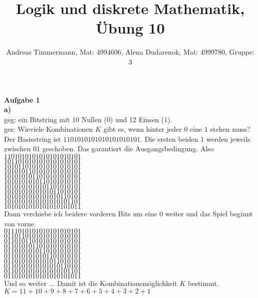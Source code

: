 \documentclass[a4paper]{scrartcl}
\title{Logik und diskrete Mathematik, Übung 10}
\author{Andreas Timmermann, Mat: 4994606, Alena Dudarenok, Mat: 4999780, Gruppe: 3}
\begin{document}
	\maketitle
	\begin{flushleft}
		\textbf{Aufgabe 1}\\

		\textbf{a)}\\
		geg: ein Bitstring mit 10 Nullen ($0$) und 12 Einsen ($1$).\\
		ges: Wieviele Kombinationen $K$ gibt es, wenn hinter jeder $0$ eine $1$ stehen muss?\\[1em]
		Der Basisstring ist $1101010101010101010101$. Die ersten beiden $1$ werden jeweils zwischen $01$ geschoben. Das garantiert die Ausgangsbedingung. Also \\[1em]
		$1101010101010101010101$\\
		$1011010101010101010101$\\
		$1010110101010101010101$\\
		$1010101101010101010101$\\
		$1010101011010101010101$\\
		$1010101010110101010101$\\
		$1010101010101101010101$\\
		$1010101010101011010101$\\
		$1010101010101010110101$\\
		$1010101010101010101101$\\
		$1010101010101010101011$\\[1em]
		Dann verchiebe ich beidere vorderen Bits um eine $0$ weiter und das Spiel beginnt von vorne.\\[1em]
		$0111010101010101010101$\\
		$0110110101010101010101$\\
		$0110101101010101010101$\\
		$0110101011010101010101$\\
		$0110101010110101010101$\\
		$0110101010101101010101$\\
		$0110101010101011010101$\\
		$0110101010101010110101$\\
		$0110101010101010101101$\\
		$0110101010101010101011$\\[1em]
		Und so weiter ... Damit ist die Kombinationsmöglichkeit $K$ bestimmt.\\
		$K=11+10+9+8+7+6+5+4+3+2+1$\\[1em]


\end{flushleft}
\end{document}

